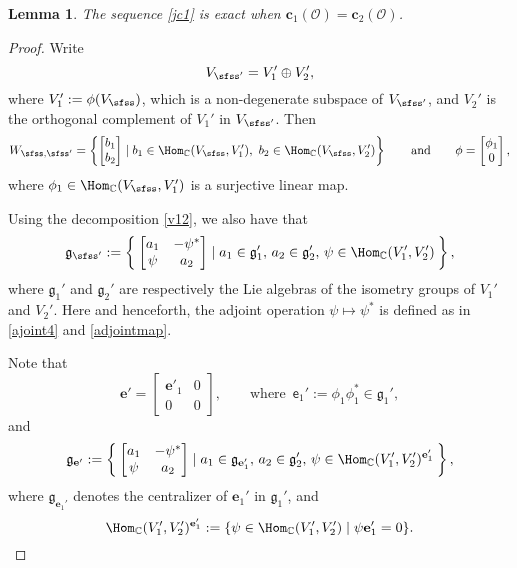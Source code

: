 \documentclass[12pt,a4paper]{amsart}
\newcommand{\CO}{{\mathcal {O}}}
\newcommand{\g}{\mathfrak g}
\newcommand{\be}{\begin {equation}}
\newcommand{\ee}{\end {equation}}
\numberwithin{equation}{section}
\newtheorem{lem}[thm]{Lemma}
\theoremstyle{remark}
\begin{document}
\begin{lem}\label{lemexact2}
The sequence \eqref{jc1} is exact when $\mathbf c_1(\CO)=\mathbf c_2(\CO)$.
\end{lem}
\begin{proof}
Write
\be\label{v12}
V_{\sfss'}=V_1'\oplus V_2',
\ee
where $V_1':=\phi(V_{\sfss})$, which is a non-degenerate subspace of $V_{\sfss'}$, and $V_2'$ is the orthogonal complement of $V_1'$ in $V_{\sfss'}$. Then
\[
   W_{\sfss, \sfss'}=\left\{\begin{bmatrix}
        b_1\\
        b_2
      \end{bmatrix} \mid b_1\in  \Hom_\C(V_\sfss, V_1'), \ b_2\in  \Hom_\C(V_\sfss, V_2')\right\} \qquad\textrm{and}\qquad \phi=\begin{bmatrix}
        \phi_1\\
        0
      \end{bmatrix},
\]
where $\phi_1\in \Hom_\C(V_\sfss, V_1')$ is a surjective linear map.

Using the decomposition \eqref{v12}, we also have that
\[
 \g_{\sfss'}:= \Set{\begin{bmatrix}
        a_1 & -\psi^*\\
        \psi & a_2
      \end{bmatrix}\mid a_1\in \g_1', \, a_2\in \g_2', \,\psi \in \Hom_\C(V_1', V_2')},
\]
where $\g_1'$ and $\g_2'$ are respectively the Lie algebras of the isometry groups of $V_1'$ and $V_2'$. Here and henceforth, the adjoint operation $\psi\mapsto \psi^*$ is defined as in
\eqref{ajoint4} and \eqref{adjointmap}.

Note that
\[
  \mathbf e'=\begin{bmatrix}
        \mathbf e'_1 & 0\\
        0 & 0
      \end{bmatrix}, \qquad \textrm{where  } \, \mathsf e_1':=\phi_1 \phi_1^*\in \g_1',%
\]
and
\[
 \g_{\mathbf e'}:= \Set{\begin{bmatrix}
        a_1 & -\psi^*\\
        \psi & a_2
      \end{bmatrix}\mid a_1\in \g_{\mathbf e_1'}, \, a_2\in \g_2', \,\psi \in \Hom_\C(V_1', V_2')^{\mathbf e_1'}},
\]
where $\g_{\mathbf e_1'}$ denotes the centralizer of $\mathbf e_1'$ in $\g_1'$, and
\[
   \Hom_\C(V_1', V_2')^{\mathbf e_1'}:=\{\psi\in  \Hom_\C(V_1', V_2')\mid \psi  {\mathbf e_1'}=0\}.
\]



\end{proof}
\end{document}
